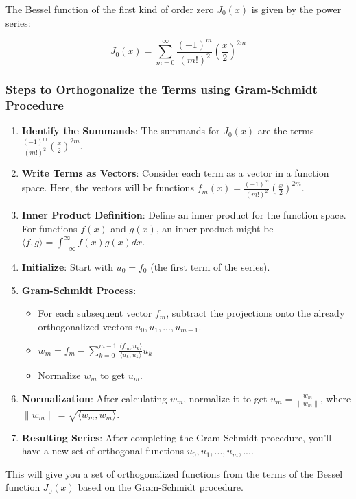 \documentclass[
]{article}
\author{}
\date{}
\providecommand{\tightlist}{%
  \setlength{\itemsep}{0pt}\setlength{\parskip}{0pt}}
\begin{document}
The Bessel function of the first kind of order zero \(J_0(x)\) is given
by the power series:

\[J_0(x) = \sum_{m=0}^{\infty} \frac{(-1)^m}{(m!)^2} \left(\frac{x}{2}\right)^{2m}\]

\hypertarget{steps-to-orthogonalize-the-terms-using-gram-schmidt-procedure}{%
\subsubsection{Steps to Orthogonalize the Terms using Gram-Schmidt
Procedure}\label{steps-to-orthogonalize-the-terms-using-gram-schmidt-procedure}}

\begin{enumerate}
\def\labelenumi{\arabic{enumi}.}
\item
  \textbf{Identify the Summands}: The summands for \(J_0(x)\) are the
  terms \(\frac{(-1)^m}{(m!)^2} \left(\frac{x}{2}\right)^{2m}\).
\item
  \textbf{Write Terms as Vectors}: Consider each term as a vector in a
  function space. Here, the vectors will be functions
  \(f_m(x) = \frac{(-1)^m}{(m!)^2} \left(\frac{x}{2}\right)^{2m}\).
\item
  \textbf{Inner Product Definition}: Define an inner product for the
  function space. For functions \(f(x)\) and \(g(x)\), an inner product
  might be
  \(\langle f, g \rangle = \int_{-\infty}^{\infty} f(x)g(x) dx\).
\item
  \textbf{Initialize}: Start with \(u_0 = f_0\) (the first term of the
  series).
\item
  \textbf{Gram-Schmidt Process}:

  \begin{itemize}
  \tightlist
  \item
    For each subsequent vector \(f_m\), subtract the projections onto
    the already orthogonalized vectors \(u_0, u_1, ..., u_{m-1}\).
  \item
    \(w_m = f_m - \sum_{k=0}^{m-1} \frac{\langle f_m, u_k \rangle}{\langle u_k, u_k \rangle} u_k\)
  \item
    Normalize \(w_m\) to get \(u_m\).
  \end{itemize}
\item
  \textbf{Normalization}: After calculating \(w_m\), normalize it to get
  \(u_m = \frac{w_m}{\| w_m \|}\), where
  \(\| w_m \| = \sqrt{\langle w_m, w_m \rangle}\).
\item
  \textbf{Resulting Series}: After completing the Gram-Schmidt
  procedure, you'll have a new set of orthogonal functions
  \(u_0, u_1, ..., u_m, ...\).
\end{enumerate}

This will give you a set of orthogonalized functions from the terms of
the Bessel function \(J_0(x)\) based on the Gram-Schmidt procedure.
\end{document}
